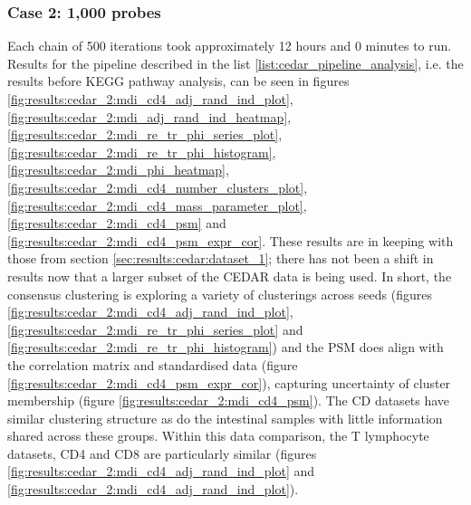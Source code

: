 \documentclass[14pt]{extarticle} %
\begin{document}
	
%	
	
	\subsubsection{Case 2: 1,000 probes} \label{sec:results:cedar:dataset_2}
	Each chain of 500 iterations took approximately 12 hours and 0 minutes to run. Results for the pipeline described in the list \ref{list:cedar_pipeline_analysis}, i.e. the results before KEGG pathway analysis, can be seen in figures \ref{fig:results:cedar_2:mdi_cd4_adj_rand_ind_plot}, \ref{fig:results:cedar_2:mdi_adj_rand_ind_heatmap}, \ref{fig:results:cedar_2:mdi_re_tr_phi_series_plot}, \ref{fig:results:cedar_2:mdi_re_tr_phi_histogram}, \ref{fig:results:cedar_2:mdi_phi_heatmap}, \ref{fig:results:cedar_2:mdi_cd4_number_clusters_plot},  \ref{fig:results:cedar_2:mdi_cd4_mass_parameter_plot}, \ref{fig:results:cedar_2:mdi_cd4_psm} and  \ref{fig:results:cedar_2:mdi_cd4_psm_expr_cor}. These results are in keeping with those from section \ref{sec:results:cedar:dataset_1}; there has not been a shift in results now that a larger subset of the CEDAR data is being used. In short, the consensus clustering is exploring a variety of clusterings across seeds (figures \ref{fig:results:cedar_2:mdi_cd4_adj_rand_ind_plot}, \ref{fig:results:cedar_2:mdi_re_tr_phi_series_plot} and \ref{fig:results:cedar_2:mdi_re_tr_phi_histogram}) and the PSM does align with the correlation matrix and standardised data (figure \ref{fig:results:cedar_2:mdi_cd4_psm_expr_cor}), capturing uncertainty of cluster membership (figure \ref{fig:results:cedar_2:mdi_cd4_psm}). The CD datasets have similar clustering structure as do the intestinal samples with little information shared across these groups. Within this data comparison, the T lymphocyte datasets, CD4 and CD8 are particularly similar (figures \ref{fig:results:cedar_2:mdi_cd4_adj_rand_ind_plot} and \ref{fig:results:cedar_2:mdi_cd4_adj_rand_ind_plot}).
	
\end{document}
